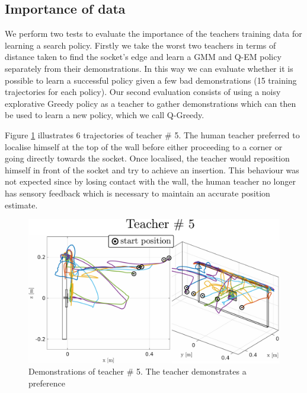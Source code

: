 \subsection{Importance of data}

We perform two tests to evaluate the importance of the teachers training data for learning a search policy. Firstly we take the 
worst two teachers in terms of distance taken to find the socket's edge and learn a GMM and Q-EM policy separately from their 
demonstrations. In this way we can evaluate whether it is possible to learn a successful policy given 
a few bad demonstrations (15 training trajectories for each policy). Our second evaluation consists of using a noisy 
explorative Greedy policy as a teacher to gather demonstrations which can then be used to learn a new policy, which we call Q-Greedy. 

Figure \ref{fig:subj_5_traj} illustrates 6 trajectories of teacher \# 5. The human teacher preferred to
localise himself at the top of the wall before either proceeding to a corner or going directly towards the socket. Once localised, the teacher 
would reposition himself in front of the socket and try to achieve an insertion. This behaviour was not expected 
since by losing contact with the wall, the human teacher no longer has sensory feedback which is necessary 
to maintain an accurate position estimate.

\begin{figure}
 \centering
    \includegraphics[width=\textwidth]{./ch4-PiH/Figures/Fig/subject5.pdf}
    \caption{Demonstrations of teacher \# 5. The teacher demonstrates a preference}
    \label{fig:subj_5_traj}
 \end{figure}
 

